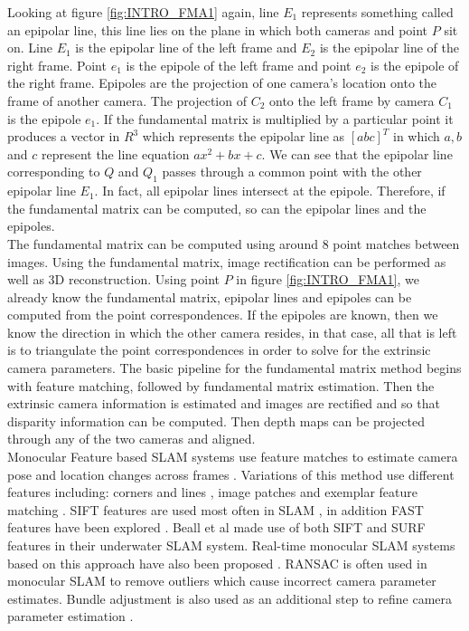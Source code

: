 Looking at figure \ref{fig:INTRO_FMA1} again, line $E_1$ represents something called an epipolar line, this line lies on the plane in which both cameras and point $P$ sit on. Line $E_1$ is the epipolar line of the left frame and $E_2$ is the epipolar line of the right frame. Point $e_1$ is the epipole of the left frame and point $e_2$ is the epipole of the right frame. Epipoles are the projection of one camera's location onto the frame of another camera. The projection of $C_2$ onto the left frame by camera $C_1$ is the epipole $e_1$. If the fundamental matrix is multiplied by a particular point it produces a vector in $R^3$ which represents the epipolar line as $[a b c]^T$ in which $a,b$ and $c$ represent the line equation $ax^2 + bx + c$. We can see that the epipolar line corresponding to $Q$ and $Q_1$ passes through a common point with the other epipolar line $E_1$. In fact, all epipolar lines intersect at the epipole. Therefore, if the fundamental matrix can be computed, so can the epipolar lines and the epipoles. \\

The fundamental matrix can be computed using around 8 point matches between images. Using the fundamental matrix, image rectification can be performed as well as 3D reconstruction. Using point $P$ in figure \ref{fig:INTRO_FMA1}, we already know the fundamental matrix, epipolar lines and epipoles can be computed from the point correspondences. If the epipoles are known, then we know the direction in which the other camera resides, in that case, all that is left is to triangulate the point correspondences in order to solve for the extrinsic camera parameters. The basic pipeline for the fundamental matrix method begins with feature matching, followed by fundamental matrix estimation. Then the extrinsic camera information is estimated and images are rectified and so that disparity information can be computed. Then depth maps can be projected through any of the two cameras and aligned. \\


Monocular Feature based SLAM systems use feature matches to estimate camera pose and location changes across frames \cite{Davison02Simultaneous}. Variations of this method use different features including: corners and lines \cite{Jeong06Visual}, image patches \cite{Silveira08Efficient} and exemplar feature matching \cite{Chekhlov07Robust}. SIFT features are used most often in SLAM \cite{Jensfelt06Framework,Pollefeys08Detailed,Beall11Bundle,Eudes10Fast}, in addition FAST features have been explored \cite{Kundu10Realtime,Leelasawassuk133d,Konolige10View,Konolige08Frameslam}. Beall et al \cite{Beall11Bundle} made use of both SIFT and SURF features in their underwater SLAM system. Real-time monocular SLAM systems based on this approach have also been proposed \cite{Chekhlov07Robust,Pollefeys08Detailed}. RANSAC is often used in monocular SLAM \cite{Eudes10Fast,Kundu10Realtime,Konolige10View,Konolige08Frameslam,Pradeep13Monofusion} to remove outliers which cause incorrect camera parameter estimates. Bundle adjustment is also used as an additional step to refine camera parameter estimation \cite{Eudes10Fast}. 


